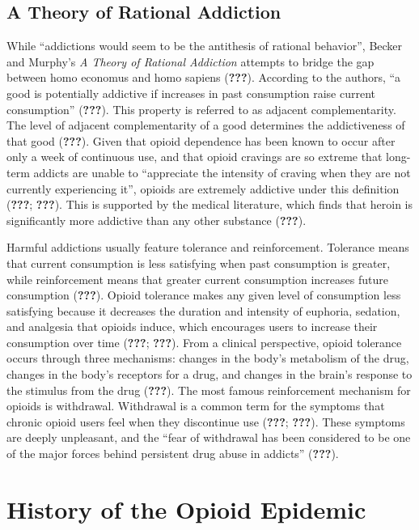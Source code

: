 \documentclass[12pt,twoside]{reedthesis}
\begin{document}
\hypertarget{a-theory-of-rational-addiction}{%
\section{A Theory of Rational Addiction}\label{a-theory-of-rational-addiction}}

While ``addictions would seem to be the antithesis of rational behavior'', Becker and Murphy's \emph{A Theory of Rational Addiction} attempts to bridge the gap between homo economus and homo sapiens ({\textbf{???}}). According to the authors, ``a good is potentially addictive if increases in past consumption raise current consumption'' ({\textbf{???}}). This property is referred to as adjacent complementarity. The level of adjacent complementarity of a good determines the addictiveness of that good ({\textbf{???}}). Given that opioid dependence has been known to occur after only a week of continuous use, and that opioid cravings are so extreme that long-term addicts are unable to ``appreciate the intensity of craving when they are not currently experiencing it'', opioids are extremely addictive under this definition ({\textbf{???}}; {\textbf{???}}). This is supported by the medical literature, which finds that heroin is significantly more addictive than any other substance ({\textbf{???}}).

Harmful addictions usually feature tolerance and reinforcement. Tolerance means that current consumption is less satisfying when past consumption is greater, while reinforcement means that greater current consumption increases future consumption ({\textbf{???}}). Opioid tolerance makes any given level of consumption less satisfying because it decreases the duration and intensity of euphoria, sedation, and analgesia that opioids induce, which encourages users to increase their consumption over time ({\textbf{???}}; {\textbf{???}}). From a clinical perspective, opioid tolerance occurs through three mechanisms: changes in the body's metabolism of the drug, changes in the body's receptors for a drug, and changes in the brain's response to the stimulus from the drug ({\textbf{???}}). The most famous reinforcement mechanism for opioids is withdrawal. Withdrawal is a common term for the symptoms that chronic opioid users feel when they discontinue use ({\textbf{???}}; {\textbf{???}}). These symptoms are deeply unpleasant, and the ``fear of withdrawal has been considered to be one of the major forces behind persistent drug abuse in addicts'' ({\textbf{???}}).

\hypertarget{history-of-the-opioid-epidemic}{%
\chapter{History of the Opioid Epidemic}\label{history-of-the-opioid-epidemic}}
\end{document}
